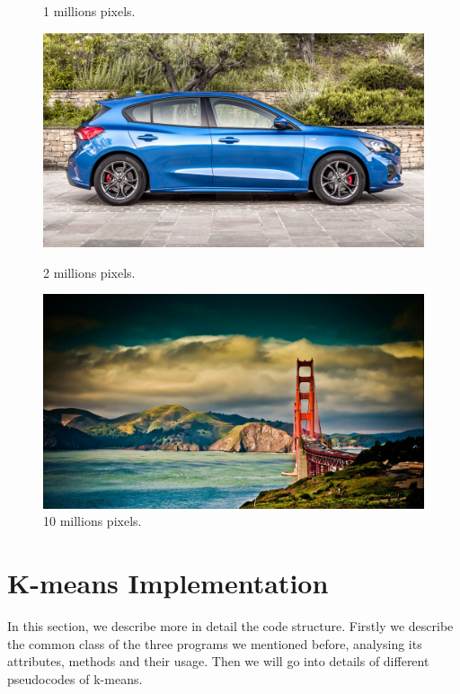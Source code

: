 \documentclass[10pt,twocolumn,letterpaper]{article}
\begin{document}
\begin{figure}[H]
\begin{minipage}[b]{0.22\textwidth}
\caption{1 millions pixels.}
\label{etichetta2}
\end{minipage}
\hfill
\begin{minipage}[b]{0.22\textwidth}
\centering
\includegraphics[width=\textwidth]{latex/car.jpg}
\caption{2 millions pixels.}
\label{etichetta2}
\end{minipage}
\hfill
\begin{minipage}[b]{0.22\textwidth}
\centering
\includegraphics[width=\textwidth]{latex/10Mp.jpg}
\caption{10 millions pixels.}
\label{etichetta2}
\end{minipage}
\end{figure}

\newpage
\section{K-means Implementation}

In this section, we describe more in detail the code structure.
Firstly we describe the common class of the three programs we mentioned before, analysing its attributes, methods and their usage. Then we will go into details of different pseudocodes of k-means.
\end{document}

